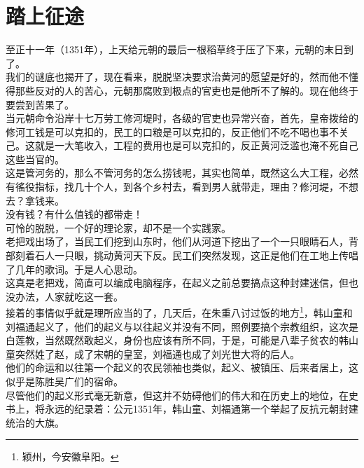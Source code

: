 \section{踏上征途}
\ifnum{}
	\begin{multicols}{\theparacolNo}
\fi
至正十一年（1351年），上天给元朝的最后一根稻草终于压了下来，元朝的末日到了。\\

我们的谜底也揭开了，现在看来，脱脱坚决要求治黄河的愿望是好的，然而他不懂得那些反对的人的苦心，元朝那腐败到极点的官吏也是他所不了解的。现在他终于要尝到苦果了。\\

当元朝命令沿岸十七万劳工修河堤时，各级的官吏也异常兴奋，首先，皇帝拨给的修河工钱是可以克扣的，民工的口粮是可以克扣的，反正他们不吃不喝也事不关己。这就是一大笔收入，工程的费用也是可以克扣的，反正黄河泛滥也淹不死自己这些当官的。\\

这是管河务的，那么不管河务的怎么捞钱呢，其实也简单，既然这么大工程，必然有徭役指标，找几十个人，到各个乡村去，看到男人就带走，理由？修河堤，不想去？拿钱来。\\

没有钱？有什么值钱的都带走！\\

可怜的脱脱，一个好的理论家，却不是一个实践家。\\

老把戏出场了，当民工们挖到山东时，他们从河道下挖出了一个一只眼睛石人，背部刻着石人一只眼，挑动黄河天下反。民工们突然发现，这正是他们在工地上传唱了几年的歌词。于是人心思动。\\

这真是老把戏，简直可以编成电脑程序，在起义之前总要搞点这种封建迷信，但也没办法，人家就吃这一套。\\

接着的事情似乎就是理所应当的了，几天后，在朱重八讨过饭的地方\footnote{颖州，今安徽阜阳。}，韩山童和刘福通起义了，他们的起义与以往起义并没有不同，照例要搞个宗教组织，这次是白莲教，当然既然敢起义，身份也应该有所不同，于是，可能是八辈子贫农的韩山童突然姓了赵，成了宋朝的皇室，刘福通也成了刘光世大将的后人。\\

他们的命运和以往第一个起义的农民领袖也类似，起义、被镇压、后来者居上，这似乎是陈胜吴广们的宿命。\\

尽管他们的起义形式毫无新意，但这并不妨碍他们的伟大和在历史上的地位，在史书上，将永远的纪录着：公元1351年，韩山童、刘福通第一个举起了反抗元朝封建统治的大旗。\\


\end{multicols}
